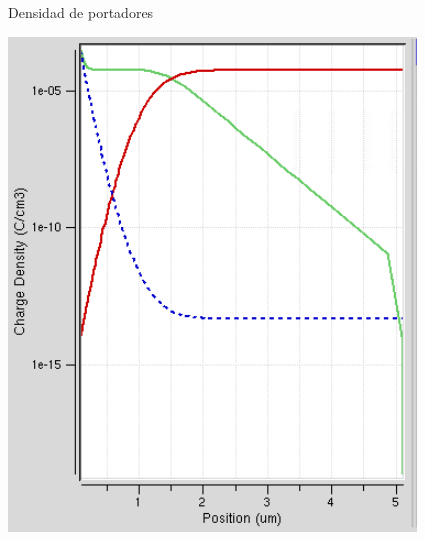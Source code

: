 \documentclass{/home/daniel/GitHub/USC-Physics-Degree-Notes/Notes/Presentacion}
\begin{document}
\begin{frame}{Densidad de portadores}
\begin{minipage}{0.55\linewidth}
        \includegraphics[width=0.65\linewidth]{../Imagenes/0-Charge.png}
    \end{minipage}
\end{frame}
\end{document}
